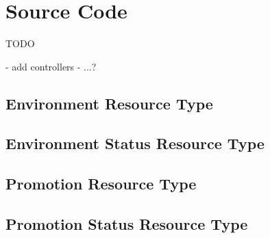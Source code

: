 \chapter{Source Code}\label{appendix:source-code}

TODO

- add controllers
- ...?

\section{Environment Resource Type}
\label{appendix:source-code:environmentSpec-type}





\section{Environment Status Resource Type}
\label{appendix:source-code:environmentStatusSpec-type}






\section{Promotion Resource Type}
\label{appendix:source-code:promotionSpec-type}





\section{Promotion Status Resource Type}
\label{appendix:source-code:promotionStatusSpec-type}





